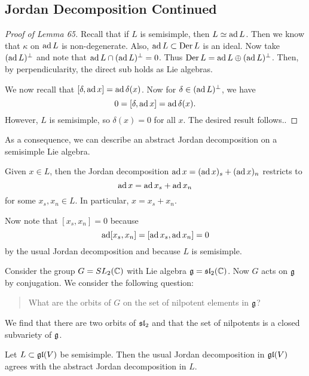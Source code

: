 \documentclass[twoside, 10pt]{article}
\begin{document}
    \subsection{Jordan Decomposition Continued}%
    \label{sub:jordan_decomposition_continued}
    
    \begin{proof}[Proof of Lemma 65]
        Recall that if $L$ is semisimple, then $L \simeq \operatorname{ad} L$. Then we know that $\kappa$ on $\operatorname{ad} L$ is non-degenerate. Also, $\operatorname{ad} L \subset \operatorname{Der} L$ is an ideal. Now take $(\operatorname{ad} L)^{\perp}$ and note that $\operatorname{ad} L \cap (\operatorname{ad} L)^{\perp} = 0$. Thus $\operatorname{Der} L = \operatorname{ad} L \oplus (\operatorname{ad} L)^{\perp}$. Then, by perpendicularity, the direct sub holds as Lie algebras.

        We now recall that $[\delta, \operatorname{ad} x] = \operatorname{ad} \delta(x)$. Now for $\delta \in (\operatorname{ad} L)^{\perp}$, we have
    \[ 0 = [\delta, \operatorname{ad} x] = \operatorname{ad} \delta(x).\] However, $L$ is semisimple, so $\delta(x) = 0$ for all $x$. The desired result follows..
    \end{proof}

    As a consequence, we can describe an abstract Jordan decomposition on a semisimple Lie algebra.

    \begin{cor}
        Given $x \in L$, then the Jordan decomposition $\operatorname{ad} x = (\operatorname{ad} x)_s + (\operatorname{ad} x)_n$ restricts to 
        \[ \operatorname{ad} x = \operatorname{ad} x_s + \operatorname{ad} x_n\] for some $x_s, x_n \in L$. In particular, $x = x_s + x_n$.
    \end{cor}

    Now note that $[x_s,x_n] = 0$ because \[\operatorname{ad} [x_s,x_n] = [\operatorname{ad} x_s, \operatorname{ad} x_n] = 0\] by the usual Jordan decomposition and because $L$ is semisimple.

    \begin{rmk}
        Consider the group $G = SL_2(\mathbb{C})$ with Lie algebra $\mathfrak{g} = \mathfrak{sl}_2(\mathbb{C})$. Now $G$ acts on $\mathfrak{g}$ by conjugation. We consider the following question:

        \begin{quote}
            What are the orbits of $G$ on the set of nilpotent elements in $\mathfrak{g}$?
        \end{quote}

        We find that there are two orbits of $\mathfrak{sl}_2$ and that the set of nilpotents is a closed subvariety of $\mathfrak{g}$.
    \end{rmk}

    \begin{thm}
        Let $L \subset \mathfrak{gl}(V)$ be semisimple. Then the usual Jordan decomposition in $\mathfrak{gl}(V)$ agrees with the abstract Jordan decomposition in $L$.
    \end{thm}
\end{document}
